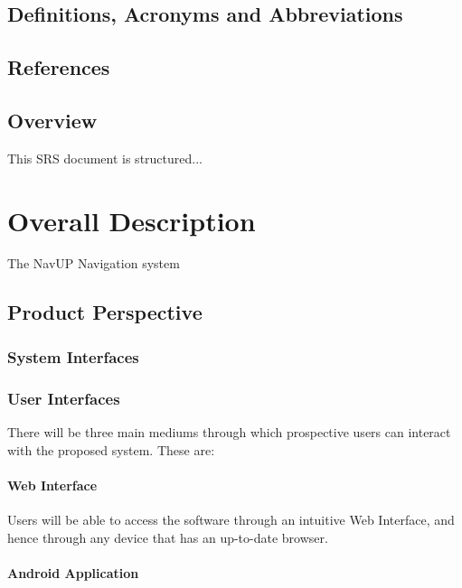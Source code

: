 \documentclass[12pt,a4paper]{article}
\begin{document}
		\subsection{Definitions, Acronyms and Abbreviations}

		\subsection{References}

		\subsection{Overview}

			This SRS document is structured...

	\section{Overall Description}

		The NavUP Navigation system

		\subsection{Product Perspective}

			\subsubsection{System Interfaces}

			\subsubsection{User Interfaces}

				There will be three main mediums through which prospective users can
				interact with the proposed system. These are:

				\paragraph{Web Interface}

					Users will be able to access the software through an intuitive Web
					Interface, and hence through any device that has an up-to-date browser.

				\paragraph{Android Application}
\end{document}
